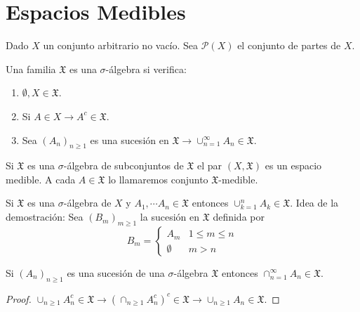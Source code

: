 \section{Espacios Medibles}

Dado $X$ un conjunto arbitrario no vacío. Sea $\mathcal{P}(X)$ el conjunto de partes de $X$.

\begin{definition}
    Una familia $\mathfrak{X}$ es una $\sigma$-álgebra si verifica:
    \begin{enumerate}
        \item $\emptyset, X \in \mathfrak{X}$.
        \item Si $A \in X \to A^c \in \mathfrak{X}$.
        \item Sea $(A_n)_{n \geq 1}$ es una sucesión en $\mathfrak{X} \to \cup_{n=1}^{\infty} A_n \in \mathfrak{X}$.
    \end{enumerate}
\end{definition}

Si $\mathfrak{X}$ es una $\sigma$-álgebra de subconjuntos de $\mathfrak{X}$ el par $(X, \mathfrak{X})$ es un espacio medible. A cada $A \in \mathfrak{X}$
lo llamaremos conjunto $\mathfrak{X}$-medible.

\begin{note}
    Si $\mathfrak{X}$ es una $\sigma$-álgebra de $X$ y $A_1, \cdots A_n \in \mathfrak{X}$ entonces $\cup_{k=1}^{n} A_k \in \mathfrak{X}$.
    Idea de la demostración: Sea $(B_m)_{m \geq 1}$ la sucesión en $\mathfrak{X}$ definida por \begin{equation}
        B_m = \begin{cases}
            A_m       & 1 \leq m \leq n \\
            \emptyset & m > n
        \end{cases}
    \end{equation}
\end{note}

\begin{note}
    Si $(A_n)_{n \geq 1}$ es una sucesión de una $\sigma$-álgebra $\mathfrak{X}$ entonces $\cap_{n=1}^{\infty} A_n \in \mathfrak{X}$.
    \begin{proof}
        $\cup_{n \geq 1} A_n^c \in \mathfrak{X} \to (\cap_{n \geq 1} A_n^c)^c \in \mathfrak{X} \to \cup_{n \geq 1} A_n \in \mathfrak{X}$.
    \end{proof}
\end{note}

